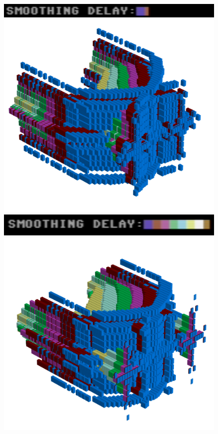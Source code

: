 \begin{figure}[H]
    \centering
    \begin{adjustbox}{width=3cm,margin=11cm -12cm}
      \includegraphics[width=12cm]{src/delay/delay-low.png}%
    \end{adjustbox}
    \begin{adjustbox}{width=10.5cm,center}
      \includegraphics[width=12cm]{src/delay/pattern0-45.png}%
    \end{adjustbox}
    \begin{adjustbox}{width=3cm,margin=11cm -12cm}
      \includegraphics[width=12cm]{src/delay/delay-high.png}%
    \end{adjustbox}
    \begin{adjustbox}{width=10.5cm,margin=0cm -2cm}
      \includegraphics[width=12cm]{src/delay/pattern1-45.png}%

\end{adjustbox}
\end{figure}
